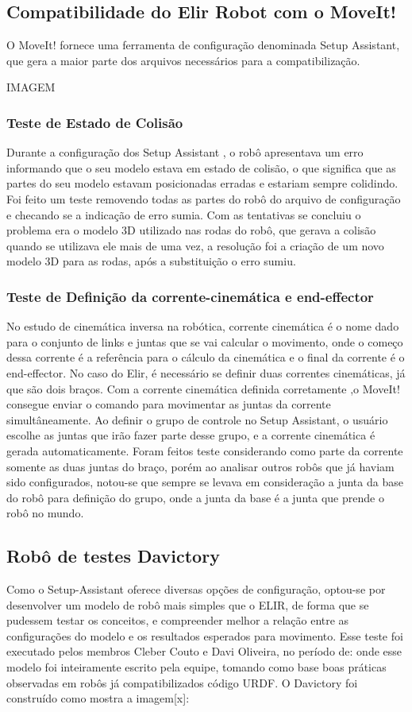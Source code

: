 \subsection{Compatibilidade do Elir Robot com o MoveIt!}
O MoveIt! fornece uma ferramenta de configuração denominada Setup Assistant, que gera a maior parte dos arquivos necessários para a compatibilização.

IMAGEM

\subsubsection{Teste de Estado de Colisão}
Durante a configuração dos Setup Assistant , o robô apresentava um erro informando que o seu modelo estava em estado de colisão, o que significa que as partes do seu modelo estavam posicionadas erradas e estariam sempre colidindo.
Foi feito um teste removendo todas as partes do robô do arquivo de configuração e checando se a indicação de erro sumia. Com as tentativas se concluiu o problema era o modelo 3D utilizado nas rodas do robô, que gerava a colisão quando se utilizava ele mais de uma vez, a resolução foi a criação de um novo modelo 3D para as rodas, após a substituição o erro sumiu.

\subsubsection{Teste de Definição da corrente-cinemática e end-effector}
No estudo de cinemática inversa na robótica, corrente cinemática é o nome dado para o conjunto de links e juntas que se vai calcular o movimento, onde o começo dessa corrente é a referência para o cálculo da cinemática e o final da corrente é o end-effector.  No caso do Elir, é necessário se definir duas correntes cinemáticas, já que são dois braços. Com a corrente cinemática definida corretamente ,o MoveIt! consegue enviar o comando para movimentar as juntas da corrente simultâneamente.
Ao definir o grupo de controle no Setup Assistant, o usuário escolhe as juntas que irão fazer parte desse grupo, e a corrente cinemática é gerada automaticamente. Foram feitos teste considerando como parte da corrente somente as duas juntas do braço, porém ao analisar outros robôs que já haviam sido configurados, notou-se que sempre se levava em consideração a junta da base do robô para definição do grupo, onde a junta da base é a junta que prende o robô no mundo.


\subsection{Robô de testes Davictory}
Como o Setup-Assistant oferece diversas opções de configuração, optou-se por desenvolver um modelo de robô mais simples que o ELIR, de forma que se pudessem testar os conceitos, e compreender melhor a relação entre as configurações do modelo e os resultados esperados para movimento.
Esse teste foi executado pelos membros Cleber Couto e Davi Oliveira, no período de: onde esse modelo foi inteiramente escrito pela equipe, tomando como base boas práticas observadas em robôs já compatibilizados código URDF. O Davictory foi construído como mostra a imagem[x]:

